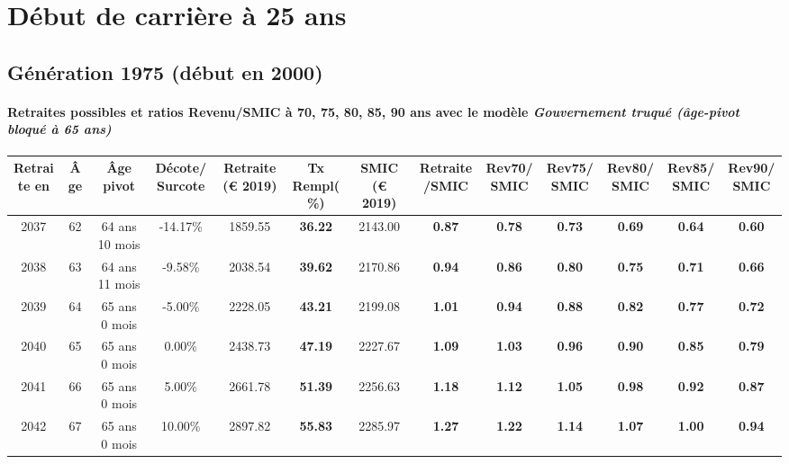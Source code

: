\section{Début de carrière à 25 ans} 

\subsection{Génération 1975 (début en 2000)} 

\paragraph{Retraites possibles et ratios Revenu/SMIC à 70, 75, 80, 85, 90 ans avec le modèle \emph{Gouvernement truqué (âge-pivot bloqué à 65 ans)}}  
 
{ \scriptsize \begin{center} 
\begin{tabular}[htb]{|c|c||c|c||c|c||c||c|c|c|c|c|c|} 
\hline 
 Retraite en &  Âge &  Âge pivot &  Décote/Surcote &  Retraite (\euro{} 2019) &  Tx Rempl(\%) &  SMIC (\euro{} 2019) &  Retraite/SMIC &  Rev70/SMIC &  Rev75/SMIC &  Rev80/SMIC &  Rev85/SMIC &  Rev90/SMIC \\ 
\hline \hline 
 2037 &  62 &  64 ans 10 mois &  -14.17\% &  1859.55 &  {\bf 36.22} &  2143.00 &  {\bf {\color{red} 0.87}} &  {\bf {\color{red} 0.78}} &  {\bf {\color{red} 0.73}} &  {\bf {\color{red} 0.69}} &  {\bf {\color{red} 0.64}} &  {\bf {\color{red} 0.60}} \\ 
\hline 
 2038 &  63 &  64 ans 11 mois &  -9.58\% &  2038.54 &  {\bf 39.62} &  2170.86 &  {\bf {\color{red} 0.94}} &  {\bf {\color{red} 0.86}} &  {\bf {\color{red} 0.80}} &  {\bf {\color{red} 0.75}} &  {\bf {\color{red} 0.71}} &  {\bf {\color{red} 0.66}} \\ 
\hline 
 2039 &  64 &  65 ans 0 mois &  -5.00\% &  2228.05 &  {\bf 43.21} &  2199.08 &  {\bf 1.01} &  {\bf {\color{red} 0.94}} &  {\bf {\color{red} 0.88}} &  {\bf {\color{red} 0.82}} &  {\bf {\color{red} 0.77}} &  {\bf {\color{red} 0.72}} \\ 
\hline 
 2040 &  65 &  65 ans 0 mois &  0.00\% &  2438.73 &  {\bf 47.19} &  2227.67 &  {\bf 1.09} &  {\bf 1.03} &  {\bf {\color{red} 0.96}} &  {\bf {\color{red} 0.90}} &  {\bf {\color{red} 0.85}} &  {\bf {\color{red} 0.79}} \\ 
\hline 
 2041 &  66 &  65 ans 0 mois &  5.00\% &  2661.78 &  {\bf 51.39} &  2256.63 &  {\bf 1.18} &  {\bf 1.12} &  {\bf 1.05} &  {\bf {\color{red} 0.98}} &  {\bf {\color{red} 0.92}} &  {\bf {\color{red} 0.87}} \\ 
\hline 
 2042 &  67 &  65 ans 0 mois &  10.00\% &  2897.82 &  {\bf 55.83} &  2285.97 &  {\bf 1.27} &  {\bf 1.22} &  {\bf 1.14} &  {\bf 1.07} &  {\bf 1.00} &  {\bf {\color{red} 0.94}} \\ 
\hline 
\hline 
\end{tabular} 
\end{center} } 
